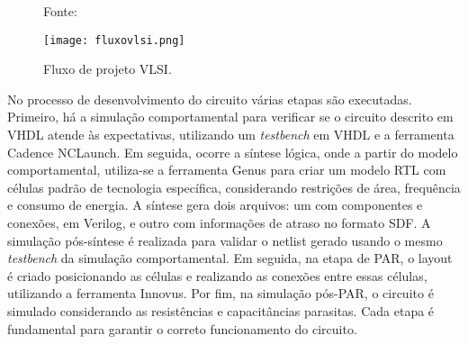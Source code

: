 \begin{figure}[ht!]
  \centering
  \captionsetup{justification=centering}
  \caption*{Fonte: \cite{CMOS2010}}
  \texttt{[image: fluxovlsi.png]}
  \caption{Fluxo de projeto VLSI.}
  \label{fig:CMOS2010}
\end{figure}

No processo de desenvolvimento do circuito várias etapas são executadas. Primeiro, há a simulação comportamental para verificar se o circuito descrito em VHDL atende às expectativas, utilizando um \textit{testbench} em VHDL e a ferramenta Cadence NCLaunch. Em seguida, ocorre a síntese lógica, onde a partir do modelo comportamental, utiliza-se a ferramenta Genus para criar um modelo RTL com células padrão de tecnologia específica, considerando restrições de área, frequência e consumo de energia. A síntese gera dois arquivos: um com componentes e conexões, em Verilog, e outro com informações de atraso no formato SDF. A simulação pós-síntese é realizada para validar o netlist gerado usando o mesmo \textit{testbench} da simulação comportamental. Em seguida, na etapa de PAR, o layout é criado posicionando as células e realizando as conexões entre essas células, utilizando a ferramenta Innovus. Por fim, na simulação pós-PAR, o circuito é simulado considerando as resistências e capacitâncias parasitas. Cada etapa é fundamental para garantir o correto funcionamento do circuito.  